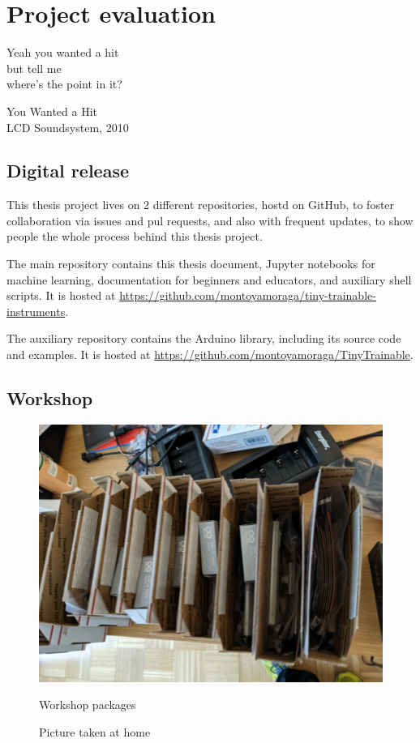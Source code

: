 \chapter{Project evaluation}

\epigraph{Yeah you wanted a hit \\ but tell me \\ where's the point in it?}{You Wanted a Hit \\ LCD Soundsystem, 2010}

\section{Digital release}

This thesis project lives on 2 different repositories, hostd on GitHub, to foster collaboration via issues and pul requests, and also with frequent updates, to show people the whole process behind this thesis project.

The main repository contains this thesis document, Jupyter notebooks for machine learning, documentation for beginners and educators, and auxiliary shell scripts. It is hosted at \url{https://github.com/montoyamoraga/tiny-trainable-instruments}.

The auxiliary repository contains the Arduino library, including its source code and examples. It is hosted at \url{https://github.com/montoyamoraga/TinyTrainable}.

\section{Workshop}

\begin{figure}[ht]
  \centering
  \includegraphics[width=0.75\linewidth,height=0.25\textheight,keepaspectratio]{images/workshop-packages.jpg}
  \caption{Workshop packages}
  \caption*{Picture taken at home}
  \label{fig:workshop-packages}
\end{figure}

